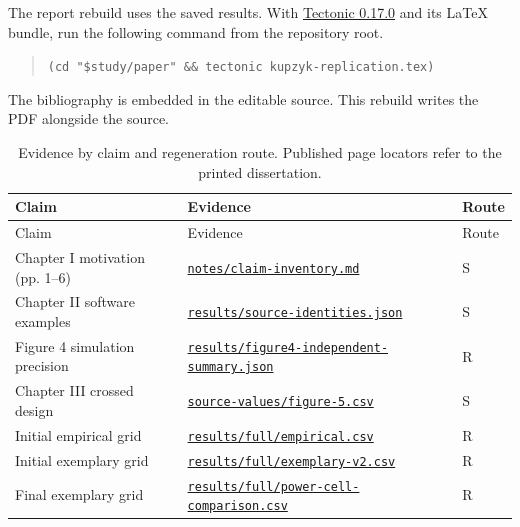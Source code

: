 The report rebuild uses the saved results. With \href{https://github.com/tectonic-typesetting/tectonic}{Tectonic 0.17.0} \citep{tectonic2026} and its LaTeX bundle, run the following command from the repository root.
\begin{quote}
\small\verb|(cd "$study/paper" && tectonic kupzyk-replication.tex)|
\end{quote}
The bibliography is embedded in the editable source. This rebuild writes the PDF alongside the source.

\small
\begin{longtable}{@{}L{.28\linewidth}L{.60\linewidth}l@{}}
\caption{Evidence by claim and regeneration route. Published page locators refer to the printed dissertation.}\\
\toprule
Claim & Evidence & Route \\
\midrule\endfirsthead
\toprule
Claim & Evidence & Route \\
\midrule\endhead
Chapter I motivation (pp. 1--6) & \href{https://github.com/alectionary/vibe-math/blob/master/formalization/kupzyk-power-assumptions/notes/claim-inventory.md}{\nolinkurl{notes/claim-inventory.md}} & S \\
Chapter II software examples & \href{https://github.com/alectionary/vibe-math/blob/master/formalization/kupzyk-power-assumptions/results/source-identities.json}{\nolinkurl{results/source-identities.json}} & S \\
Figure 4 simulation precision & \href{https://github.com/alectionary/vibe-math/blob/master/formalization/kupzyk-power-assumptions/results/figure4-independent-summary.json}{\nolinkurl{results/figure4-independent-summary.json}} & R \\
Chapter III crossed design & \href{https://github.com/alectionary/vibe-math/blob/master/formalization/kupzyk-power-assumptions/source-values/figure-5.csv}{\nolinkurl{source-values/figure-5.csv}} & S \\
Initial empirical grid & \href{https://github.com/alectionary/vibe-math/blob/master/formalization/kupzyk-power-assumptions/results/full/empirical.csv}{\nolinkurl{results/full/empirical.csv}} & R \\
Initial exemplary grid & \href{https://github.com/alectionary/vibe-math/blob/master/formalization/kupzyk-power-assumptions/results/full/exemplary-v2.csv}{\nolinkurl{results/full/exemplary-v2.csv}} & R \\
Final exemplary grid & \href{https://github.com/alectionary/vibe-math/blob/master/formalization/kupzyk-power-assumptions/results/full/power-cell-comparison.csv}{\nolinkurl{results/full/power-cell-comparison.csv}} & R \\

\end{longtable}
